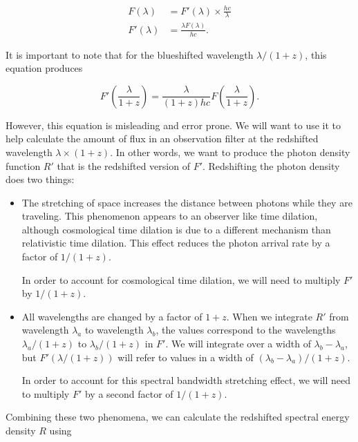\documentclass[linenumbers]{aastex631}
\begin{document}
\begin{equation}
\begin{aligned}
   F(\lambda) &= F'(\lambda) \times \frac{hc}{\lambda} \\
  F'(\lambda) &= \frac{\lambda F(\lambda)}{hc}.
\end{aligned}
\end{equation}

It is important to note that for the blueshifted wavelength $\lambda / (1+z)$,
this equation produces

\begin{equation}
 F'\left(\frac{\lambda}{1+z}\right) = \frac{\lambda}{(1+z)hc} F\left(\frac{\lambda}{1+z}\right).
\end{equation}

However, this equation is misleading and error prone. We will want to use it to
help calculate the amount of flux in an observation filter at the redshifted
wavelength $\lambda \times (1 + z)$. In other words, we want to produce the
photon density function $R'$ that is the redshifted version of $F'$.
Redshifting the photon density does two things:

\begin{itemize}
  \item The stretching of space increases the distance between photons while
  they are traveling. This phenomenon appears to an observer like time
  dilation, although cosmological time dilation is due to a different mechanism
  than relativistic time dilation. This effect reduces the photon arrival rate
  by a factor of $1/(1+z)$.

  In order to account for cosmological time dilation, we will need to multiply
  $F'$ by $1/(1+z)$.

  \item All wavelengths are changed by a factor of $1 + z$. When we integrate
  $R'$ from wavelength $\lambda_a$ to wavelength $\lambda_b$, the values
  correspond to the wavelengths $\lambda_a / (1+z)$ to $\lambda_b / (1+z)$ in
  $F'$. We will integrate over a width of $\lambda_b - \lambda_a$, but
  $F'(\lambda / (1+z))$ will refer to values in a width of
  $(\lambda_b - \lambda_a) / (1+z)$.

  In order to account for this spectral bandwidth stretching effect, we will need
  to multiply $F'$ by a second factor of $1/(1+z)$.
\end{itemize}

Combining these two phenomena, we can calculate the redshifted spectral energy
density $R$ using
\end{document}
